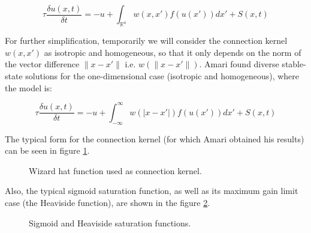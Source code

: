 \begin{equation}
  \label{eq:nf-simp}
  \tau \frac{\delta u(x,t)}{\delta
    t}=-u+\int_{\mathbb{R}^{n}}{w(x,x')f\left(
      u(x')\right) dx'}+S(x,t)
\end{equation}

For further simplification, temporarily we will consider the
connection kernel $w(x,x')$ as isotropic and homogeneous, so that it
only depends on the norm of the vector difference $\lVert x-x'\rVert$
i.e. $w\left( \lVert x-x'\rVert \right)$. Amari found diverse
stable-state solutions for the one-dimensional case (isotropic and
homogeneous), where the model is:

\begin{equation}
  \label{eq:nf-oned}
  \tau \frac{\delta u(x,t)} {\delta
    t}=-u+\int_{-\infty}^{\infty} {w\left( \lvert x-x'\rvert \right)
    f\left( u(x') \right) dx'}+S(x,t)
\end{equation}

The typical form for the connection kernel (for which Amari obtained
his results) can be seen in figure \ref{fig:wiz-hat}.

\begin{figure}[h]
  \centering
  \caption{Wizard hat function used as connection kernel.}
  \label{fig:wiz-hat}
\end{figure}

Also, the typical sigmoid saturation function, as well as its maximum
gain limit case (the Heaviside function), are shown in the figure
\ref{fig:sat-fun}.

\begin{figure}[h]
  \centering
  \caption{Sigmoid and Heaviside saturation functions.}
  \label{fig:sat-fun}
\end{figure}





